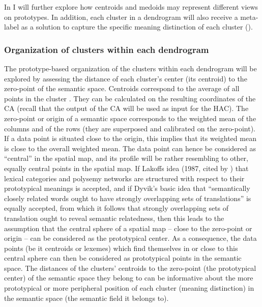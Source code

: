 In  I will further explore how centroids and medoids may represent different views on prototypes. In addition, each cluster in a dendrogram will also receive a meta-label as a solution to capture the specific meaning distinction of each cluster ().

\subsubsection{Organization of clusters within each dendrogram}
\label{sec:3.8.1.1}  
The prototype-based organization of the clusters within each dendrogram will be explored by assessing the distance of each cluster’s center (its centroid) to the zero-point of the semantic space. Centroids correspond to the average of all points in the cluster \citep[494]{tan_introduction_2006}. They can be calculated on the resulting coordinates of the CA (recall that the output of the CA will be used as input for the HAC). The zero-point or origin of a semantic space corresponds to the weighted mean of the columns and of the rows (they are superposed and calibrated on the zero-point). If a data point is situated close to the origin, this implies that its weighted mean is close to the overall weighted mean. The data point can hence be considered as ``central'' in the spatial map, and its profile will be rather resembling to other, equally central points in the spatial map. If Lakoffs idea (1987, cited by \citealt{tyler_semantics_2003}) that lexical categories and polysemy networks are structured with respect to their prototypical meanings is accepted, and if Dyvik’s basic idea that “semantically closely related words ought to have strongly overlapping sets of translations” is equally accepted, from which it follows that strongly overlapping sets of translation ought to reveal semantic relatedness, then this leads to the assumption that the central sphere of a spatial map – close to the zero-point or origin – can be considered as the prototypical center. As a consequence, the data points (be it centroids or lexemes) which find themselves in or close to this central sphere can then be considered as prototypical points in the semantic space. The distances of the clusters’ centroids to the zero-point (the prototypical center) of the semantic space they belong to can be informative about the more prototypical or more peripheral position of each cluster (meaning distinction) in the semantic space (the semantic field it belongs to).

